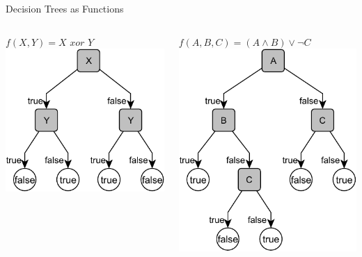 \documentclass[14pt]{beamer}
\begin{document}
\begin{frame}{Decision Trees as Functions}
\begin{columns}[t]
\begin{column}{2in}
$f(X, Y) = X \textit{ xor } Y$ \\[1em]
\includegraphics[scale=.75]{xor}
\end{column}
\begin{column}{2in}
$f(A, B, C) = (A \land B) \lor \lnot C$ \\[1em]
\includegraphics[scale=.75]{abc}
\end{column}
\end{columns}
\end{frame}
\end{document}
